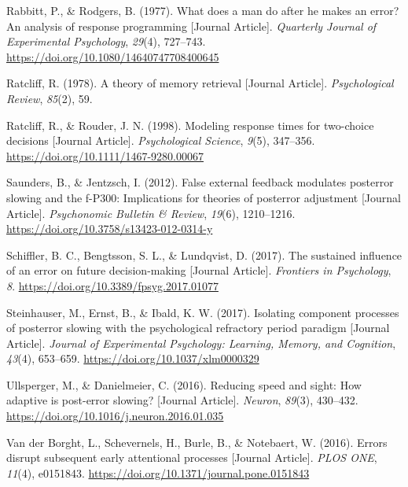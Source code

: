 \documentclass[
  man,floatsintext]{apa7}
\newlength{\cslhangindent}
\newlength{\cslentryspacingunit} %
\newenvironment{CSLReferences}[2] %
 {%
  \setlength{\parindent}{0pt}
  \ifodd #1
  \let\oldpar\par
  \def\par{\hangindent=\cslhangindent\oldpar}
  \fi
  \setlength{\parskip}{#2\cslentryspacingunit}
 }%
 {}
\begin{document}
\begin{CSLReferences}{1}{0}
\leavevmode{}%
Rabbitt, P., \& Rodgers, B. (1977). What does a man do after he makes an error? An analysis of response programming {[}Journal Article{]}. \emph{Quarterly Journal of Experimental Psychology}, \emph{29}(4), 727--743. \url{https://doi.org/10.1080/14640747708400645}

\leavevmode{}%
Ratcliff, R. (1978). A theory of memory retrieval {[}Journal Article{]}. \emph{Psychological Review}, \emph{85}(2), 59.

\leavevmode{}%
Ratcliff, R., \& Rouder, J. N. (1998). Modeling response times for two-choice decisions {[}Journal Article{]}. \emph{Psychological Science}, \emph{9}(5), 347--356. \url{https://doi.org/10.1111/1467-9280.00067}

\leavevmode{}%
Saunders, B., \& Jentzsch, I. (2012). False external feedback modulates posterror slowing and the f-P300: Implications for theories of posterror adjustment {[}Journal Article{]}. \emph{Psychonomic Bulletin \& Review}, \emph{19}(6), 1210--1216. \url{https://doi.org/10.3758/s13423-012-0314-y}

\leavevmode{}%
Schiffler, B. C., Bengtsson, S. L., \& Lundqvist, D. (2017). The sustained influence of an error on future decision-making {[}Journal Article{]}. \emph{Frontiers in Psychology}, \emph{8}. \url{https://doi.org/10.3389/fpsyg.2017.01077}

\leavevmode{}%
Steinhauser, M., Ernst, B., \& Ibald, K. W. (2017). Isolating component processes of posterror slowing with the psychological refractory period paradigm {[}Journal Article{]}. \emph{Journal of Experimental Psychology: Learning, Memory, and Cognition}, \emph{43}(4), 653--659. \url{https://doi.org/10.1037/xlm0000329}

\leavevmode{}%
Ullsperger, M., \& Danielmeier, C. (2016). Reducing speed and sight: How adaptive is post-error slowing? {[}Journal Article{]}. \emph{Neuron}, \emph{89}(3), 430--432. \url{https://doi.org/10.1016/j.neuron.2016.01.035}

\leavevmode{}%
Van der Borght, L., Schevernels, H., Burle, B., \& Notebaert, W. (2016). Errors disrupt subsequent early attentional processes {[}Journal Article{]}. \emph{PLOS ONE}, \emph{11}(4), e0151843. \url{https://doi.org/10.1371/journal.pone.0151843}


\end{CSLReferences}
\end{document}
